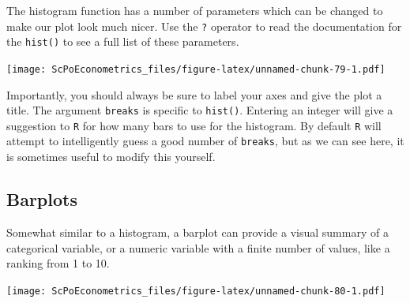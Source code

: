 \documentclass[]{book}
\newenvironment{Shaded}{\begin{snugshade}}{\end{snugshade}}
\newcommand{\KeywordTok}[1]{\textcolor[rgb]{0.13,0.29,0.53}{\textbf{#1}}}
\newcommand{\DataTypeTok}[1]{\textcolor[rgb]{0.13,0.29,0.53}{#1}}
\newcommand{\DecValTok}[1]{\textcolor[rgb]{0.00,0.00,0.81}{#1}}
\newcommand{\StringTok}[1]{\textcolor[rgb]{0.31,0.60,0.02}{#1}}
\newcommand{\CommentTok}[1]{\textcolor[rgb]{0.56,0.35,0.01}{\textit{#1}}}
\newcommand{\OperatorTok}[1]{\textcolor[rgb]{0.81,0.36,0.00}{\textbf{#1}}}
\newcommand{\NormalTok}[1]{#1}
\theoremstyle{definition}
\theoremstyle{definition}
\theoremstyle{definition}
\theoremstyle{remark}
\begin{document}
The histogram function has a number of parameters which can be changed
to make our plot look much nicer. Use the \texttt{?} operator to read
the documentation for the \texttt{hist()} to see a full list of these
parameters.

\begin{Shaded}
\end{Shaded}

\texttt{[image: ScPoEconometrics\_files/figure-latex/unnamed-chunk-79-1.pdf]}

Importantly, you should always be sure to label your axes and give the
plot a title. The argument \texttt{breaks} is specific to
\texttt{hist()}. Entering an integer will give a suggestion to
\texttt{R} for how many bars to use for the histogram. By default
\texttt{R} will attempt to intelligently guess a good number of
\texttt{breaks}, but as we can see here, it is sometimes useful to
modify this yourself.

\subsection{Barplots}\label{barplots}

Somewhat similar to a histogram, a barplot can provide a visual summary
of a categorical variable, or a numeric variable with a finite number of
values, like a ranking from 1 to 10.

\begin{Shaded}
\end{Shaded}

\texttt{[image: ScPoEconometrics\_files/figure-latex/unnamed-chunk-80-1.pdf]}

\begin{Shaded}
\end{Shaded}
\end{document}
